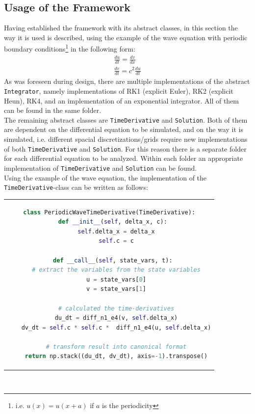 \subsection{Usage of the Framework}
Having established the framework with its abstract classes, in this section the way it is used is described, using the example of the wave equation with periodic boundary conditions\footnote{i.e. $u(x)=u(x+a)$ if $a$ is the periodicity} in the following form:
\begin{align*}
\frac{du}{dt} = \frac{dv}{dx}\\
\frac{dv}{dt} = c^2\frac{du}{dt}
\end{align*}
As was foreseen during design, there are multiple implementations of the abstract \texttt{Integrator}, namely implementations of RK1 (explicit Euler), RK2 (explicit Heun), RK4, and an implementation of an exponential integrator.
All of them can be found in the same folder.
\\
The remaining abstract classes are \texttt{TimeDerivative} and \texttt{Solution}.
Both of them are dependent on the differential equation to be simulated, and on the way it is simulated, i.e. different spacial discretizations/grids require new implementations of both \texttt{TimeDerivative} and \texttt{Solution}.
For this reason there is a separate folder for each differential equation to be analyzed.
Within each folder an appropriate implementation of \texttt{TimeDerivative} and \texttt{Solution} can be found.
\\
Using the example of the wave equation, the implementation of the \texttt{TimeDerivative}-class can be written as follows:\\
\begin{tabular}{c}
\begin{lstlisting}[language=Python]
class PeriodicWaveTimeDerivative(TimeDerivative):
  def __init__(self, delta_x, c):
    self.delta_x = delta_x
    self.c = c

  def __call__(self, state_vars, t):
    # extract the variables from the state variables
    u = state_vars[0]
    v = state_vars[1]
			
    # calculated the time-derivatives
    du_dt = diff_n1_e4(v, self.delta_x)
    dv_dt = self.c * self.c *  diff_n1_e4(u, self.delta_x)
        	
    # transform result into canonical format
    return np.stack((du_dt, dv_dt), axis=-1).transpose()
\end{lstlisting}
\end{tabular}\\
